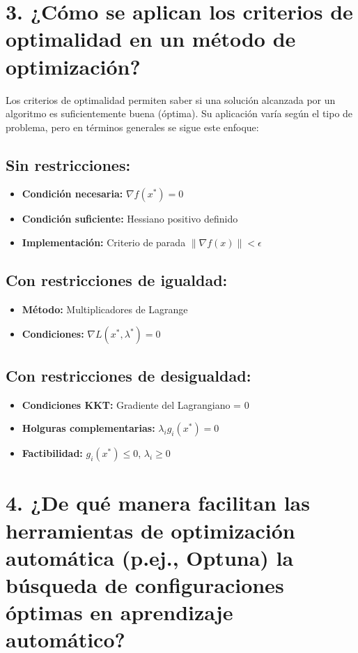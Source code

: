 \documentclass[12pt,a4paper]{article}
\begin{document}
\section*{3. ¿Cómo se aplican los criterios de optimalidad en un método de optimización?}

Los criterios de optimalidad permiten saber si una solución alcanzada por un algoritmo es suficientemente buena (óptima). Su aplicación varía según el tipo de problema, pero en términos generales se sigue este enfoque:

\subsection*{Sin restricciones:}
\begin{itemize}[leftmargin=1.5cm]
    \item \textbf{Condición necesaria:} $\nabla f(x^*) = 0$
    \item \textbf{Condición suficiente:} Hessiano positivo definido
    \item \textbf{Implementación:} Criterio de parada $\|\nabla f(x)\| < \epsilon$
\end{itemize}

\subsection*{Con restricciones de igualdad:}
\begin{itemize}[leftmargin=1.5cm]
    \item \textbf{Método:} Multiplicadores de Lagrange
    \item \textbf{Condiciones:} $\nabla L(x^*,\lambda^*) = 0$
\end{itemize}

\subsection*{Con restricciones de desigualdad:}
\begin{itemize}[leftmargin=1.5cm]
    \item \textbf{Condiciones KKT:} Gradiente del Lagrangiano = 0
    \item \textbf{Holguras complementarias:} $\lambda_i g_i(x^*) = 0$
    \item \textbf{Factibilidad:} $g_i(x^*) \leq 0$, $\lambda_i \geq 0$
\end{itemize}

\section*{4. ¿De qué manera facilitan las herramientas de optimización automática (p.ej., Optuna) la búsqueda de configuraciones óptimas en aprendizaje automático?}
\end{document}
